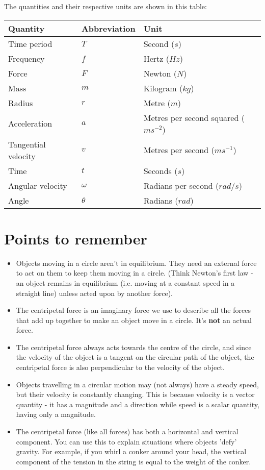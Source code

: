 \documentclass{article}
\begin{document}
The quantities and their respective units are shown in this table:

\begin{center}
	\begin{tabular}{|l|l|l|}
		\hline
			Quantity & Abbreviation & Unit \\ \hline
			Time period & $T$ & Second ($s$) \\ \hline
			Frequency & $f$ & Hertz ($Hz$) \\ \hline
			Force & $F$ & Newton ($N$) \\ \hline
			Mass & $m$ & Kilogram ($kg$) \\ \hline
			Radius & $r$ & Metre ($m$) \\ \hline
			Acceleration & $a$ & Metres per second squared ($ms^{-2}$) \\ \hline
			Tangential velocity & $v$ & Metres per second ($ms^{-1}$) \\ \hline
			Time & $t$ & Seconds ($s$) \\ \hline
			Angular velocity & $\omega$ & Radians per second ($rad/s$) \\ \hline
			Angle & $\theta$ & Radians ($rad$) \\ \hline
	\end{tabular}
\end{center}


\section*{Points to remember}

\begin{itemize}
	\item Objects moving in a circle aren't in equilibrium. They need an
	external force to act on them to keep them moving in a circle. (Think
	Newton's first law - an object remains in equilibrium (i.e. moving at a
	constant speed in a straight line) unless acted upon by another force).
	\item The centripetal force is an imaginary force we use to describe all the
	forces that add up together to make an object move in a circle. It's
	\textbf{not} an actual force.
	\item The centripetal force always acts towards the centre of the circle,
	and since the velocity of the object is a tangent on the circular path of
	the object, the centripetal force is also perpendicular to the velocity of
	the object.
	\item Objects travelling in a circular motion may (not always) have a steady
	speed, but their velocity is constantly changing. This is because velocity
	is a vector quantity - it has a magnitude and a direction while speed is a
	scalar quantity, having only a magnitude.
	\item The centripetal force (like all forces) has both a horizontal and
	vertical component. You can use this to explain situations where objects
	'defy' gravity. For example, if you whirl a conker around your head, the
	vertical component of the tension in the string is equal to the weight of
	the conker.
\end{itemize}
\end{document}
